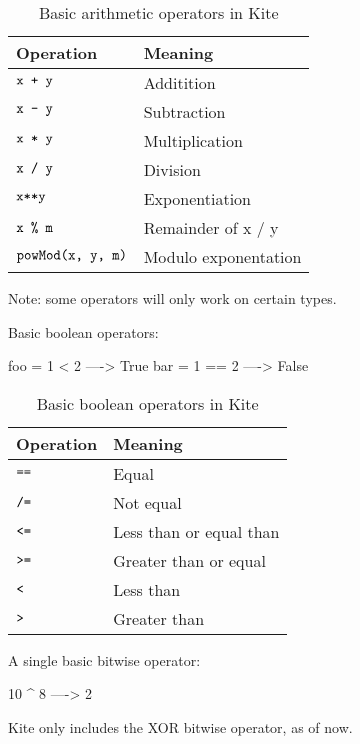 \begin{table}[H]
  \centering
  \begin{tabular}{|l|l|}
    \hline
    Operation      & Meaning              \\ \hline
    $\texttt{x + y}$        & Additition           \\ \hline
    $\texttt{x - y}$        & Subtraction          \\ \hline
    $\texttt{x * y}$        & Multiplication       \\ \hline
    $\texttt{x / y}$        & Division             \\ \hline
    $\texttt{x**y}$         & Exponentiation       \\ \hline
    $\texttt{x \% m}$       & Remainder of x / y   \\ \hline
    $\texttt{powMod(x, y, m)}$ & Modulo exponentation \\ \hline
  \end{tabular}
  \caption{Basic arithmetic operators in Kite}
\label{tbl:kite-design-arith-op}
\end{table}
Note: some operators will only work on certain types.

Basic boolean operators:
\begin{kite}
foo = 1 < 2  ----> True
bar = 1 == 2 ----> False
\end{kite}

\begin{table}[H]
  \centering
  \begin{tabular}{|l|l|}
    \hline
    Operation   & Meaning                 \\ \hline
    $\texttt{==}$ & Equal                   \\ \hline
    $\texttt{/=}$ & Not equal               \\ \hline
    $\texttt{<=}$ & Less than or equal than \\ \hline
    $\texttt{>=}$ & Greater than or equal   \\ \hline
    $\texttt{<}$  & Less than               \\ \hline
    $\texttt{>}$  & Greater than            \\ \hline
  \end{tabular}
  \caption{Basic boolean operators in Kite}
\label{tbl:kite-disign-bool-op}
\end{table}

A single basic bitwise operator:
\begin{kite}
10 ^ 8 ----> 2
\end{kite}
Kite only includes the XOR bitwise operator, as of now.


